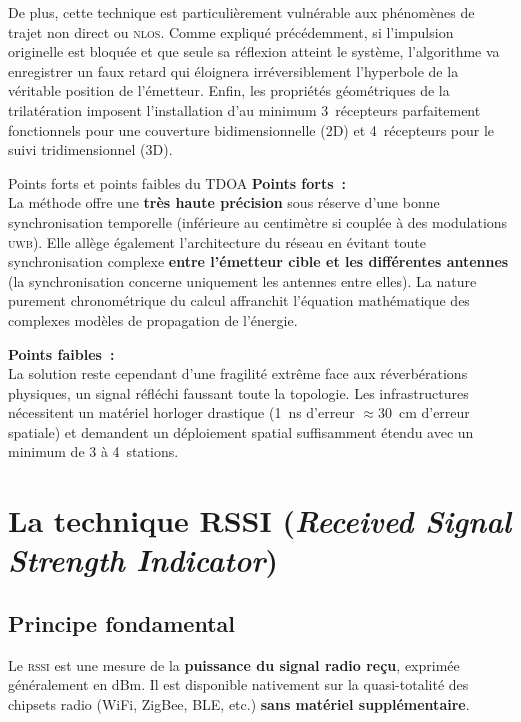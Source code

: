 \documentclass[12pt, a4paper]{article}
\newcommand{\RSSI}{\textsc{rssi}}
\newcommand{\UWB}{\textsc{uwb}}
\newcommand{\NLOS}{\textsc{nlos}}
\begin{document}
De plus, cette technique est particulièrement vulnérable aux phénomènes de trajet non direct ou \NLOS{}. Comme expliqué précédemment, si l'impulsion originelle est bloquée et que seule sa réflexion atteint le système, l'algorithme va enregistrer un faux retard qui éloignera irréversiblement l'hyperbole de la véritable position de l'émetteur. Enfin, les propriétés géométriques de la trilatération imposent l'installation d'au minimum 3~récepteurs parfaitement fonctionnels pour une couverture bidimensionnelle (2D) et 4~récepteurs pour le suivi tridimensionnel (3D).

\begin{summarybox}{Points forts et points faibles du TDOA}
\textbf{Points forts~:}\\
La méthode offre une \textbf{très haute précision} sous réserve d'une bonne synchronisation temporelle (inférieure au centimètre si couplée à des modulations \UWB{}). Elle allège également l'architecture du réseau en évitant toute synchronisation complexe \textbf{entre l'émetteur cible et les différentes antennes} (la synchronisation concerne uniquement les antennes entre elles). La nature purement chronométrique du calcul affranchit l'équation mathématique des complexes modèles de propagation de l'énergie.

\medskip
\textbf{Points faibles~:}\\
La solution reste cependant d'une fragilité extrême face aux réverbérations physiques, un signal réfléchi faussant toute la topologie. Les infrastructures nécessitent un matériel horloger drastique (1~ns d'erreur $\approx 30$~cm d'erreur spatiale) et demandent un déploiement spatial suffisamment étendu avec un minimum de 3 à 4~stations.
\end{summarybox}

\section{La technique RSSI (\textit{Received Signal Strength Indicator})}

\subsection{Principe fondamental}

Le \RSSI{} est une mesure de la \textbf{puissance du signal radio reçu}, exprimée
généralement en dBm. Il est disponible nativement sur la quasi-totalité des chipsets
radio (WiFi, ZigBee, BLE, etc.) \textbf{sans matériel supplémentaire}.
\end{document}
